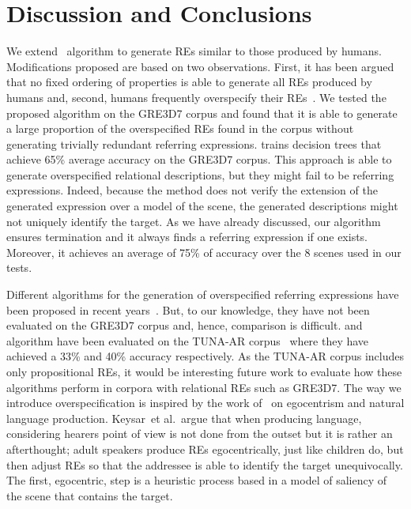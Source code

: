 \section{Discussion and Conclusions} \label{sec:discussion}

We extend~ algorithm to generate REs similar to those produced by humans. Modifications 
proposed are based on two observations. First, it has been argued that no fixed ordering of properties is able to generate all REs produced by humans and, second, humans frequently overspecify their REs~\cite{Engelhardt_Bailey_Ferreira_2006,Arts_Maes_Noordman_Jansen_2011,viet:gene11}. We tested 
the proposed algorithm on the GRE3D7 corpus and found that it is able to generate a large proportion of the overspecified REs found in the corpus without generating trivially redundant referring expressions.
%
 trains decision trees that achieve 65\% average accuracy on the GRE3D7 corpus. 
This approach is able to generate overspecified relational descriptions, but they might fail to be referring 
expressions. Indeed, because the  method does not verify the extension of the generated expression over a model of the scene, the 
generated descriptions might not uniquely identify the target.  As we have already discussed,
our algorithm ensures termination and it always finds a referring expression if one exists.  Moreover, it achieves an average of 75\% of accuracy over the 8 scenes used in our tests. 

Different algorithms for the generation of overspecified referring expressions have been proposed in recent years~\cite{delucena-paraboni:2008:ENLG,ruud-emiel-mariet:2012:INLG2012}.  But, to our knowledge, they have not been evaluated on the 
GRE3D7 corpus and, hence, comparison is difficult.  and  algorithm
have been evaluated on the TUNA-AR corpus~\cite{gatt-balz-kow:2008:ENLG} where they have achieved a 33\% and 40\% accuracy respectively. 
As the TUNA-AR corpus includes only propositional REs, it would be interesting future work to evaluate how these algorithms perform in corpora with relational REs such as GRE3D7. The way we introduce overspecification is inspired by the work of~ on egocentrism and natural language production.  Keysar~et al.\ argue that when producing language, considering hearers point of view is not done from the outset but it is rather an afterthought; adult speakers produce REs egocentrically, just like children do, but then adjust REs so that the addressee is able to identify the target unequivocally. The first, egocentric, step is a heuristic process based in a model of saliency of the scene that contains the target. 

